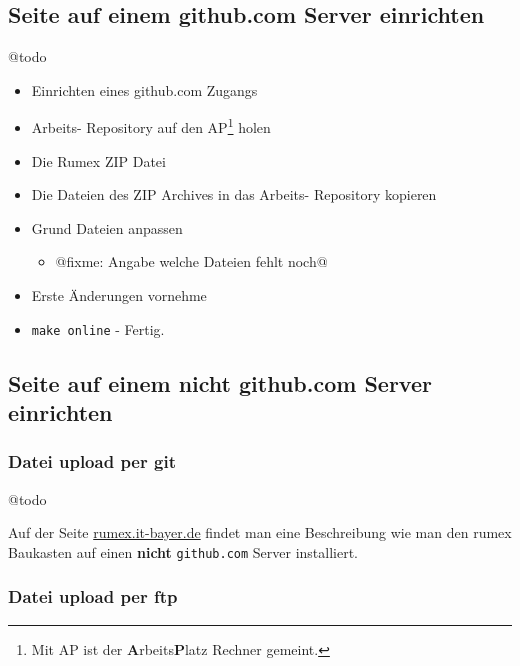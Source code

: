 \documentclass[%
fontsize=12pt,%
parskip=half,%
version=last%
]{scrreprt}
\begin{document}
\subsection{Seite auf einem github.com Server
einrichten}\label{seite-auf-einem-github.com-server-einrichten}

@todo

\begin{itemize}
\itemsep1pt\parskip0pt
\item
  Einrichten eines github.com Zugangs
\item
  Arbeits- Repository auf den AP\footnote{Mit AP ist der
    \textbf{A}rbeits\textbf{P}latz Rechner gemeint.} holen
\item
  Die Rumex ZIP Datei
\item
  Die Dateien des ZIP Archives in das Arbeits- Repository kopieren
\item
  Grund Dateien anpassen

  \begin{itemize}
  \itemsep1pt\parskip0pt
  \item
    @fixme: Angabe welche Dateien fehlt noch@
  \end{itemize}
\item
  Erste Änderungen vornehme
\item
  \texttt{make online} - Fertig.
\end{itemize}

\subsection{Seite auf einem nicht github.com Server
einrichten}\label{seite-auf-einem-nicht-github.com-server-einrichten}

\subsubsection{Datei upload per git}\label{datei-upload-per-git}

@todo

Auf der Seite \href{http://rumex.it-bayer.de}{rumex.it-bayer.de} findet
man eine Beschreibung wie man den rumex Baukasten auf einen
\textbf{nicht} \texttt{github.com} Server installiert.

\subsubsection{Datei upload per ftp}\label{datei-upload-per-ftp}
\end{document}
